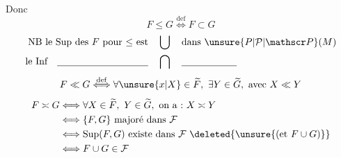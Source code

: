 Donc
\[
F\leq G\overset{\mathrm{def}}{\Longleftrightarrow}F\subset G
\]
\[
\begin{aligned}
\text{NB le Sup des $F$ pour $\leq$ est}\quad&\bigcup\quad\text{dans $\unsure{P|\mathcal P|\mathscr P}(M)$}\\
\text{le Inf}\quad\underline{\hspace{3.3cm}}\quad&\bigcap\quad\underline{\hspace{2cm}}
\end{aligned}
\]
\[
F\ll G\overset{\mathrm{def}}{\Longleftrightarrow}\forall\unsure{x|X}\in\widetilde F,\ \exists Y\in\widetilde G,\ \text{avec}\ X\ll Y
\]
\[
\begin{aligned}
F\asymp G&\Longleftrightarrow\forall X\in\widetilde F,\ Y\in\widetilde G,\ \text{on a :}\ X\asymp Y\\
&\Longleftrightarrow\{F,G\}\ \text{majoré dans}\ \mathcal F\\
&\Longleftrightarrow\operatorname{Sup}(F,G)\ \text{existe dans}\ \mathcal F\ \deleted{\unsure{\text{(et }F\cup G\text{)}}}\\
&\Longleftrightarrow F\cup G\in\mathcal F
\end{aligned}
\]
